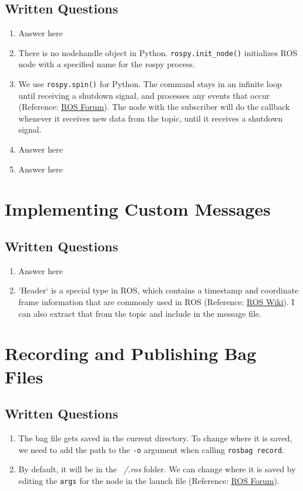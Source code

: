\documentclass[letta4 paper]{article}
\numberwithin{equation}{section}
\newcommand{\0}{\mathbf{0}}
\begin{document}
	\subsection{Written Questions}
	\begin{enumerate}
		\item Answer here
		\item There is no nodehandle object in Python. \lstinline{rospy.init_node()} initializes ROS node with a specified name for the rospy process.
		\item We use \lstinline{rospy.spin()} for Python. The command stays in an infinite loop until receiving a shutdown signal, and processes any events that occur (Reference: \href{https://answers.ros.org/question/332192/difference-between-rospyspin-and-rospysleep/}{ROS Forum}). The node with the subscriber will do the callback whenever it receives new data from the topic, until it receives a shutdown signal.
		\item Answer here
		\item Answer here
	\end{enumerate}{}
			
	\section{ Implementing Custom Messages}
	
	\subsection{Written Questions}
	\begin{enumerate}
		\item Answer here
		\item `Header` is a special type in ROS, which contains a timestamp and coordinate frame information that are commonly used in ROS (Reference: \href{http://wiki.ros.org/ROS/Tutorials/CreatingMsgAndSrv#Creating_a_msg}{ROS Wiki}). I can also extract that from the topic and include in the message file. 
	\end{enumerate}{}

	\section{Recording and Publishing Bag Files}
	\subsection{Written Questions}
	
	\begin{enumerate}
		\item The bag file gets saved in the current directory. To change where it is saved, we need to add the path to the \lstinline{-o} argument when calling \lstinline{rosbag record}.
		\item By default, it will be in the \textit{~/.ros} folder. We can change where it is saved by editing the \lstinline{args} for the node in the launch file (Reference: \href{https://answers.ros.org/question/106126/giving-a-directory-to-output-file-in-a-launcher-for-rosbag-record-and-rostopic-echo/?answer=222874?answer=222874#post-id-222874}{ROS Forum}).
	\end{enumerate}{}
\end{document}
